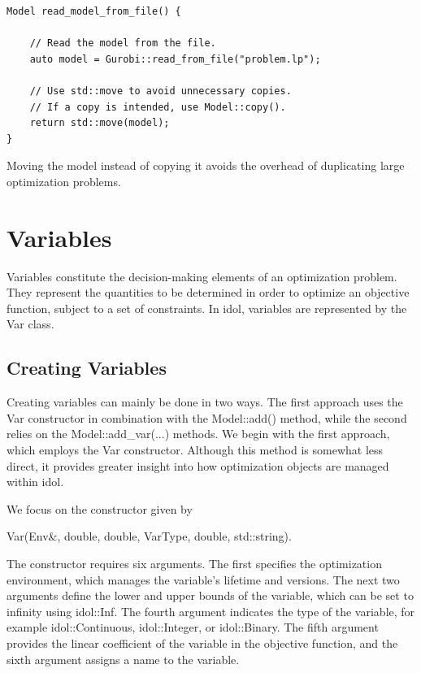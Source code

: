 \begin{lstlisting}
Model read_model_from_file() {
    
    // Read the model from the file.
    auto model = Gurobi::read_from_file("problem.lp");

    // Use std::move to avoid unnecessary copies.
    // If a copy is intended, use Model::copy().
    return std::move(model); 
}
\end{lstlisting}

Moving the model instead of copying it avoids the overhead of duplicating
large optimization problems.

\section{Variables}

Variables constitute the decision-making elements of an optimization problem.
They represent the quantities to be determined in order to optimize an
objective function, subject to a set of constraints. In \textsf{idol},
variables are represented by the \textsf{Var} class.

\subsection{Creating Variables}

Creating variables can mainly be done in two ways. The first approach uses the
\textsf{Var} constructor in combination with the \textsf{Model::add()} method,
while the second relies on the \textsf{Model::add\_var(...)} methods. We begin
with the first approach, which employs the \textsf{Var} constructor. Although
this method is somewhat less direct, it provides greater insight into how
optimization objects are managed within \textsf{idol}.

We focus on the constructor given by
\begin{center}
    \textsf{Var(Env\&, double, double, VarType, double, std::string)}.
\end{center}
The constructor requires six arguments. The first specifies the optimization
environment, which manages the variable's lifetime and versions. The next two
arguments define the lower and upper bounds of the variable, which can be set
to infinity using \textsf{idol::Inf}. The fourth argument indicates the type
of the variable, for example \textsf{idol::Continuous}, \textsf{idol::Integer},
or \textsf{idol::Binary}. The fifth argument provides the linear coefficient of
the variable in the objective function, and the sixth argument assigns a name
to the variable. 

